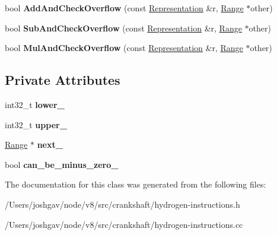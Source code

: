 \begin{DoxyCompactItemize}
\item 
bool {\bfseries Add\+And\+Check\+Overflow} (const \hyperlink{classv8_1_1internal_1_1_representation}{Representation} \&r, \hyperlink{classv8_1_1internal_1_1_range}{Range} $\ast$other)\hypertarget{classv8_1_1internal_1_1_range_af6d59101739fd544c37008db1a6ec0e6}{}\label{classv8_1_1internal_1_1_range_af6d59101739fd544c37008db1a6ec0e6}

\item 
bool {\bfseries Sub\+And\+Check\+Overflow} (const \hyperlink{classv8_1_1internal_1_1_representation}{Representation} \&r, \hyperlink{classv8_1_1internal_1_1_range}{Range} $\ast$other)\hypertarget{classv8_1_1internal_1_1_range_a7d92e3ecc750733f460066e89db7da28}{}\label{classv8_1_1internal_1_1_range_a7d92e3ecc750733f460066e89db7da28}

\item 
bool {\bfseries Mul\+And\+Check\+Overflow} (const \hyperlink{classv8_1_1internal_1_1_representation}{Representation} \&r, \hyperlink{classv8_1_1internal_1_1_range}{Range} $\ast$other)\hypertarget{classv8_1_1internal_1_1_range_afee32e7ffb602837892eacce7598b645}{}\label{classv8_1_1internal_1_1_range_afee32e7ffb602837892eacce7598b645}

\end{DoxyCompactItemize}
\subsection*{Private Attributes}
\begin{DoxyCompactItemize}
\item 
int32\+\_\+t {\bfseries lower\+\_\+}\hypertarget{classv8_1_1internal_1_1_range_ababaf57df53fd3cd9e3c06b1226ec8eb}{}\label{classv8_1_1internal_1_1_range_ababaf57df53fd3cd9e3c06b1226ec8eb}

\item 
int32\+\_\+t {\bfseries upper\+\_\+}\hypertarget{classv8_1_1internal_1_1_range_aee6ffd8aa57bec9f4d686724ed2e9962}{}\label{classv8_1_1internal_1_1_range_aee6ffd8aa57bec9f4d686724ed2e9962}

\item 
\hyperlink{classv8_1_1internal_1_1_range}{Range} $\ast$ {\bfseries next\+\_\+}\hypertarget{classv8_1_1internal_1_1_range_a9aeddf2d45584933d1d3ea1aa32b6fdc}{}\label{classv8_1_1internal_1_1_range_a9aeddf2d45584933d1d3ea1aa32b6fdc}

\item 
bool {\bfseries can\+\_\+be\+\_\+minus\+\_\+zero\+\_\+}\hypertarget{classv8_1_1internal_1_1_range_a20817cecdb3e152bbc71d48c11199694}{}\label{classv8_1_1internal_1_1_range_a20817cecdb3e152bbc71d48c11199694}

\end{DoxyCompactItemize}


The documentation for this class was generated from the following files\+:\begin{DoxyCompactItemize}
\item 
/\+Users/joshgav/node/v8/src/crankshaft/hydrogen-\/instructions.\+h\item 
/\+Users/joshgav/node/v8/src/crankshaft/hydrogen-\/instructions.\+cc\end{DoxyCompactItemize}
